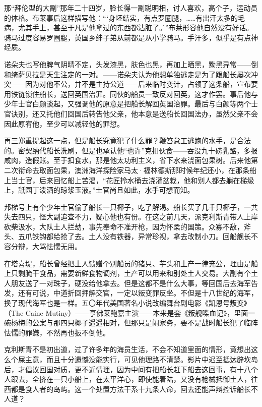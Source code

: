 \par 那“拜伦型的大副”那年二十四岁，脸长得一副聪明相，讨人喜欢，高个子，运动员的体格。布莱事后这样描写他：“‘身坯结实，有点罗圈腿，……有出汗太多的毛病，尤其手上，甚至于凡是他拿过的东西都沾脏了。'”布莱形容他自然没有好话。骑马过度容易罗圈腿，英国乡绅子弟从前都是从小学骑马。手汗多，似乎是有点神经质。
\par 诺朵夫也写他脾气阴晴不定，头发漆黑，肤色也黑，再加上晒黑，黝黑异常——倒和绮萨贝拉是天生注定的一对。——诺朵夫认为他想单独逃走是为了跟船长屡次冲突——因为对他不公，并不是主持公道——后来临时变计，占领了这条船，宣布要用铁链锁住船长，送回英国治罪。同伙的船员一致反对回英，这才作罢。事后他与少年士官白颜谈起，又强调他的原意是把船长解回英国治罪。最后与白颜等两个士官诀别，还又托他们回国后转告他父亲，他本意是送船长回国法办，虽然父亲不会因此原宥他，至少可以减轻他的罪愆。
\par 再三郑重提起这一点，但是船长究竟犯了什么罪？鞭笞怠工逃跑的水手，是合法的。密契纳代船长洗刷，但是也承认他“也许”克扣伙食——吞没九十磅乳酪，多报咸肉，造假账。至于扣食水，那是他太功利主义，省下水来浇面包果树。后来他第二次衔命去取面包果，澳洲海洋探险家马太·福林德斯那时候年纪还小，在那条船上当士官，后来回忆船上苦渴，“花匠拎水桶去浇灌盆栽，他和别人都去躺在梯级上，舐园丁泼洒的琼浆玉液。”士官尚且如此，水手可想而知。
\par 邦梯号上有个少年士官偷了船长一只椰子，吃了解渴。船长买了几千只椰子，一共失去四只，怪大副追查不力，疑心他也有份。在这之前几天，派克利斯青带人上岸砍柴汲水，大队土人拦劫，事先奉命不准开枪，因为怀柔的国策。众寡不敌，斧头、五爪铁钩都给抢了去。土人没有铁器，异常珍视，拿去改制小刀。回船舰长不容分辩，大骂怯懦无用。
\par 在塔喜堤，船长曾经把土人馈赠个别船员的猪只、芋头和土产一律充公，理由是船上只剩腌干食品，需要新鲜食物调剂，土产可以用来和别处土人交易。大副有个土人朋友送了一对珠子，硬没给他拿去。但是这都不是什么大事，等回国后去海军告发，还有可说，中道折回押解交官，一定以叛变罪反坐。不但是十八世纪的海军，换了现代海军也是一样。五〇年代美国著名小说改编舞台剧电影《凯恩号叛变》（The Caine Mutiny）——亨佛莱鲍嘉主演——本来是套《叛舰喋血记》，里面一碗杨梅的公案与那四只椰子遥遥相对，但那只是闹家务，要不是战时船长犯了临阵怯懦的罪嫌，不然再也扳不倒他。
\par 克利斯青不是初出道，过了许多年的海员生活，不会不知道里面的情形，竟想出这么个屎主意，而且十分遗憾没能实行，可见他理路不清楚。影片中迟至抵达辟坎岛后，才倡议回国对质，更不近情理，因为中间有把船长赶下船去这回事，有十八个人跟去，全挤在一只小船上，在太平洋心，即使能着陆，又没有枪械抵御土人，往西都是食人者的岛屿。这一个处置方法干系十九条人命，回去还能声辩控诉船长不人道？
